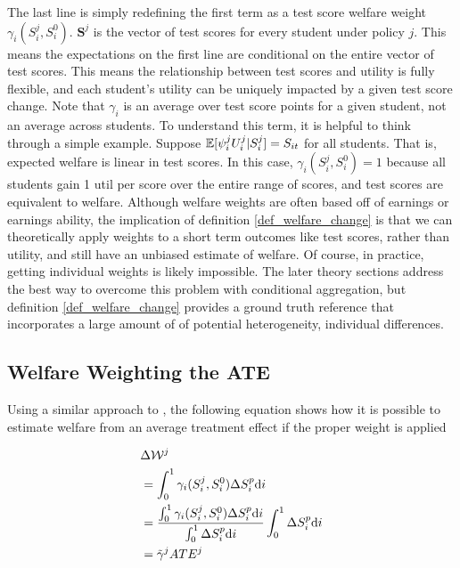 \documentclass[12pt]{article}
\theoremstyle{definition}
\theoremstyle{definition}
\theoremstyle{definition}
\theoremstyle{definition}
\begin{document}
    The last line is simply redefining the first term as a test score welfare weight $\gamma_i(S_i^j, S_i^0)$. $\bm{S}^j$ is the vector of test scores for every student under policy $j$. This means the expectations on the first line are conditional on the entire vector of test scores. This means the relationship between test scores and utility is fully flexible, and each student's utility can be uniquely impacted by a given test score change. Note that $\gamma_i$ is an average over test score points for a given student, not an average across students. To understand this term, it is helpful to think through a simple example. Suppose  $ \mathbb{E}[\psi^j_i U^j_i |S_i^j] = S_{it}$ for all students. That is, expected welfare is linear in test scores. In this case,  $\gamma_i(S_i^j, S_i^0) = 1$ because all students gain 1 util per score over the entire range of scores, and test scores are equivalent to welfare. Although welfare weights are often based off of earnings or earnings ability, the implication of definition \ref{def_welfare_change} is that we can theoretically apply weights to a short term outcomes like test scores, rather than utility, and still have an unbiased estimate of welfare. Of course, in practice, getting individual weights is likely impossible. The later theory sections address the best way to overcome this problem with conditional aggregation, but definition \ref{def_welfare_change} provides a ground truth reference that incorporates a large amount of of potential heterogeneity, individual differences. 
 
\subsection{Welfare Weighting the ATE}
\label{appendix_ww_ate}
    Using a similar approach to  \cite{Keyser_2020}, the following equation shows how it is possible to estimate welfare from an average treatment effect if the proper weight is applied


    \begin{align}
           & \Delta \mathcal{W}^j \\
           &  = \int_0^1 \gamma_i(S_i^j, S_i^0) \Delta S^p_i \text{d}i\\
           & = \frac{\int_0^1 \gamma_i(S_i^j, S_i^0) \Delta S^p_i \text{d}i}{\int_0^1 \Delta S^p_i \text{d}i} \int_0^1 \Delta S^p_i \text{d}i \\
           & =  \Tilde{\gamma}^j ATE^j 
    \end{align}
\end{document}
